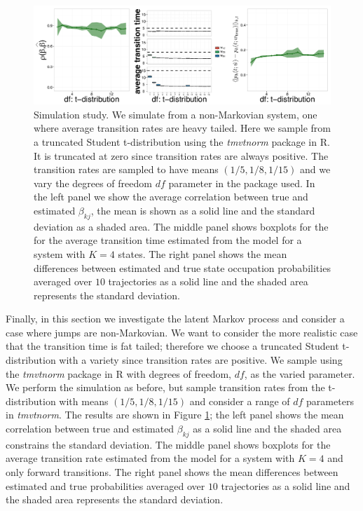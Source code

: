 \begin{figure}
  \centering \includegraphics[width=1\textwidth]{pics/student-t.pdf}
  \caption{Simulation study. We simulate from a non-Markovian system, one where average transition rates are heavy tailed. Here we sample from a truncated Student t-distribution using the \emph{tmvtnorm} package in R. It is truncated at zero since transition rates are always positive. The transition rates are sampled to have means $(1/5, 1/8, 1/15)$ and we vary the degrees of freedom $df$ parameter in the package used. In the left panel we show the average correlation between true and estimated $\beta_{kj}$, the mean is shown as a solid line and the standard deviation as a shaded area. The middle panel shows boxplots for the for the average transition time estimated from the model for a system with $K=4$ states. The right panel shows the mean differences between estimated and true state occupation probabilities averaged over $10$ trajectories as a solid line and the shaded area represents the standard deviation.}
\label{fig:student}
\end{figure}


Finally, in this section we investigate the latent Markov process and consider a case where jumps are non-Markovian. We want to consider the more realistic case that the transition time is fat tailed; therefore we choose a truncated Student t-distribution with a variety since transition rates are positive. We sample using the \emph{tmvtnorm} package in R with degrees of freedom, $df$, as the varied parameter. We perform the simulation as before, but sample transition rates from the t-distribution with means $(1/5, 1/8, 1/15)$ and consider a range of $df$ parameters in \emph{tmvtnorm}. The results are shown in Figure \ref{fig:student}; the left panel shows the mean correlation between true and estimated $\beta_{kj}$ as a solid line and the shaded area constrains the standard deviation. The middle panel shows boxplots for the average transition rate estimated from the model for a system with $K=4$ and only forward transitions. The right panel shows the mean differences between estimated and true probabilities averaged over $10$ trajectories as a solid line and the shaded area represents the standard deviation.


